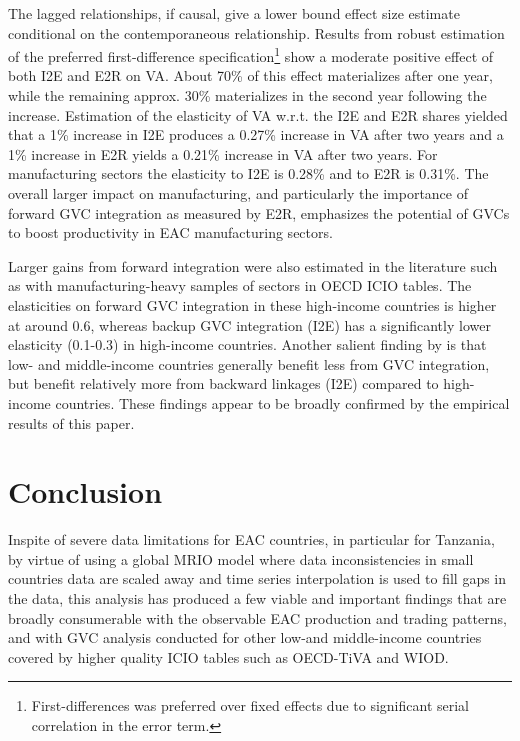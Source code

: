 \documentclass[a4paper]{article}
\begin{document}
The lagged relationships, if causal, give a lower bound effect size estimate conditional on the contemporaneous relationship. Results from robust estimation of the preferred first-difference specification\footnote{First-differences was preferred over fixed effects due to significant serial correlation in the error term.} show a moderate positive effect of both I2E and E2R on VA. About 70\% of this effect materializes after one year, while the remaining approx. 30\% materializes in the second year following the increase. Estimation of the elasticity of VA w.r.t. the I2E and E2R shares yielded that a 1\% increase in I2E produces a 0.27\% increase in VA after two years and a 1\% increase in E2R yields a 0.21\% increase in VA after two years. For manufacturing sectors the elasticity to I2E is 0.28\% and to E2R is 0.31\%. The overall larger impact on manufacturing, and particularly the importance of forward GVC integration as measured by E2R, emphasizes the potential of GVCs to boost productivity in EAC manufacturing sectors. \newline

Larger gains from forward integration were also estimated in the literature such as \citet{Kummritz20161} with manufacturing-heavy samples of sectors in OECD ICIO tables. The elasticities on forward GVC integration in these high-income countries is higher at around 0.6, whereas backup GVC integration (I2E) has a significantly lower elasticity (0.1-0.3) in high-income countries. Another salient finding by \citet{kummritz2015global} is that low- and middle-income countries generally benefit less from GVC integration, but benefit relatively more from backward linkages (I2E) compared to high-income countries. These findings appear to be broadly confirmed by the empirical results of this paper. \newpage

\section{Conclusion} 

Inspite of severe data limitations for EAC countries, in particular for Tanzania, by virtue of using a global MRIO model where data inconsistencies in small countries data are scaled away and time series interpolation is used to fill gaps in the data, this analysis has produced a few viable and important findings that are broadly consumerable with the observable EAC production and trading patterns, and  with GVC analysis conducted for other low-and middle-income countries covered by higher quality ICIO tables such as OECD-TiVA and WIOD. \newline
\end{document}
